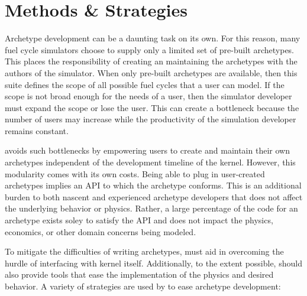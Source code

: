 \section{Methods \& Strategies}
\label{sec-methods}

Archetype development can be a daunting task on its own. For this reason,
many fuel cycle simulators choose to supply only a limited set of
pre-built archetypes. This places the responsibility of creating an maintaining
the archetypes with the authors of the simulator.  When only pre-built archetypes are available, then this suite defines the scope
of all possible fuel cycles that a user can model. If the scope is not broad
enough for the needs of a user, then the simulator developer must expand the
scope or lose the user.  This can create a bottleneck because the number of users
may increase while the productivity of the simulation developer remains constant.

\Cyclus avoids such bottlenecks by empowering users to create and maintain
their own archetypes independent of the development timeline of the \cyclus
kernel. However, this modularity comes with its own costs. Being able to
plug in user-created archetypes implies an \gls{API} to which
the archetype conforms. This is an
additional burden to both nascent and experienced archetype developers that
does not affect the underlying behavior or physics. Rather, a large percentage of the
code for an archetype exists soley to satisfy the \cyclus \gls{API} and does not
impact the physics, economics, or other domain concerns being modeled.

To mitigate the difficulties of writing archetypes,
\cyclus must aid in overcoming the hurdle of interfacing with
kernel itself. Additionally, to the extent possible, \cyclus should
also provide tools that
ease the implementation of the physics and desired behavior.
A variety of strategies are used by \cyclus to ease archetype development:


